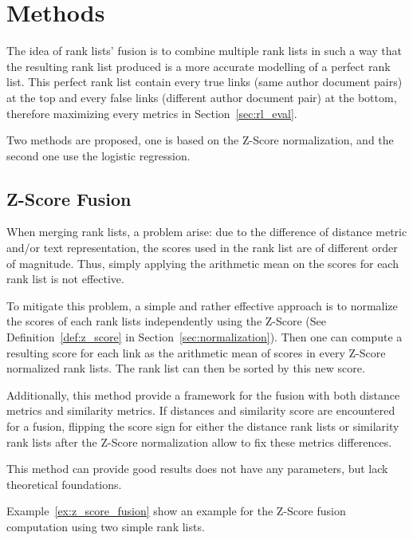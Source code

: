 \section{Methods \label{sec:rank_lists_fusion}}

The idea of rank lists' fusion is to combine multiple rank lists in such a way that the resulting rank list produced is a more accurate modelling of a perfect rank list.
This perfect rank list contain every true links (same author document pairs) at the top and every false links (different author document pair) at the bottom, therefore maximizing every metrics in Section~\ref{sec:rl_eval}.

Two methods are proposed, one is based on the Z-Score normalization, and the second one use the logistic regression.

\subsection{Z-Score Fusion}

When merging rank lists, a problem arise: due to the difference of distance metric and/or text representation, the scores used in the rank list are of different order of magnitude.
Thus, simply applying the arithmetic mean on the scores for each rank list is not effective.

To mitigate this problem, a simple and rather effective approach is to normalize the scores of each rank lists independently using the Z-Score (See Definition~\ref{def:z_score} in Section~\ref{sec:normalization}).
Then one can compute a resulting score for each link as the arithmetic mean of scores in every Z-Score normalized rank lists.
The rank list can then be sorted by this new score.

Additionally, this method provide a framework for the fusion with both distance metrics and similarity metrics.
If distances and similarity score are encountered for a fusion, flipping the score sign for either the distance rank lists or similarity rank lists after the Z-Score normalization allow to fix these metrics differences.

This method can provide good results does not have any parameters, but lack theoretical foundations.

Example~\ref{ex:z_score_fusion} show an example for the Z-Score fusion computation using two simple rank lists.

